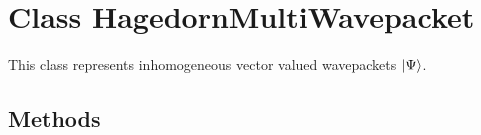 
\section{Class HagedornMultiWavepacket}

    \label{HagedornMultiWavepacket:HagedornMultiWavepacket}
This class represents inhomogeneous vector valued wavepackets
$\Ket{\Psi}$.



  \subsection{Methods}

    \label{HagedornMultiWavepacket:HagedornMultiWavepacket:__init__}

    \vspace{0.5ex}


